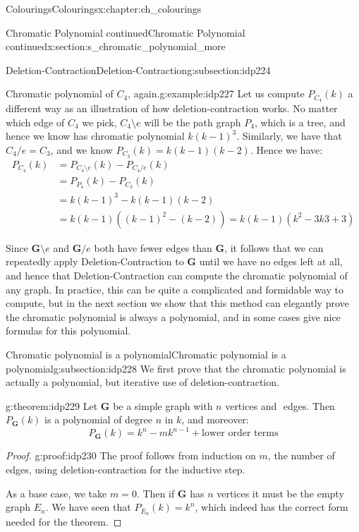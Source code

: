 \documentclass[oneside,10pt,]{book}
\numberwithin{equation}{section}
\newcommand{\bfG}{\mathbf{G}}
\newcommand{\amp}{&}
\begin{document}
\begin{chapterptx}{Colourings}{}{Colourings}{}{}{x:chapter:ch_colourings}
\begin{sectionptx}{Chromatic Polynomial continued}{}{Chromatic Polynomial continued}{}{}{x:section:s_chromatic_polynomial_more}
\begin{subsectionptx}{Deletion-Contraction}{}{Deletion-Contraction}{}{}{g:subsection:idp224}
\begin{example}{Chromatic polynomial of \(C_4\), again.}{g:example:idp227}
Let us compute \(P_{C_4}(k)\) a different way as an illustration of how deletion-contraction works.  No matter which edge of \(C_4\) we pick, \(C_4\setminus e\) will be the path graph \(P_4\), which is a tree, and hence we know has chromatic polynomial \(k(k-1)^3\).  Similarly, we have that \(C_4/e=C_3\), and we know \(P_{C_3}(k)=k(k-1)(k-2)\).  Hence we have:%
%
\begin{align*}
P_{C_4}(k) \amp = P_{C_4\setminus e}(k)-P_{C_4/e}(k) \\
\amp = P_{P_4}(k)-P_{C_3}(k) \\
\amp = k(k-1)^3 - k(k-1)(k-2) \\
\amp = k(k-1)\left( (k-1)^2-(k-2)\right) = k(k-1)(k^2-3k3+3)
\end{align*}
\end{example}
Since \(\bfG\setminus e\) and \(\bfG/e\) both have fewer edges than \(\bfG\), it follows that we can repeatedly apply Deletion-Contraction to \(\bfG\) until we have no edges left at all, and hence that Deletion-Contraction can compute the chromatic polynomial of any graph.  In practice, this can be quite a complicated and formidable way to compute, but in the next section we show that this method can elegantly prove the chromatic polynomial is always a polynomial, and in some cases give nice formulas for this polynomial.%
\end{subsectionptx}
%
%
\typeout{************************************************}
\typeout{************************************************}
%
\begin{subsectionptx}{Chromatic polynomial is a polynomial}{}{Chromatic polynomial is a polynomial}{}{}{g:subsection:idp228}
We first prove that the chromatic polynomial is actually a polynomial, but iterative use of deletion-contraction.%
\begin{theorem}{}{}{g:theorem:idp229}%
Let \(\bfG\) be a simple graph with \(n\) vertices and \(\) edges.  Then \(P_\bfG(k)\) is a polynomial of degree \(n\) in \(k\), and moreover:%
%
\begin{equation*}
P_\bfG(k)=k^n-mk^{n-1}+\text{lower order terms}
\end{equation*}
\end{theorem}
\begin{proof}{}{g:proof:idp230}
The proof follows from induction on \(m\), the number of edges, using deletion-contraction for the inductive step.%
\par
As a base case, we take \(m=0\).  Then if \(\bfG\) has \(n\) vertices it must be the empty graph \(E_n\).  We have seen that \(P_{E_n}(k)=k^n\), which indeed has the correct form needed for the theorem.%

\end{proof}
\end{subsectionptx}
\end{sectionptx}
\end{chapterptx}
\end{document}
